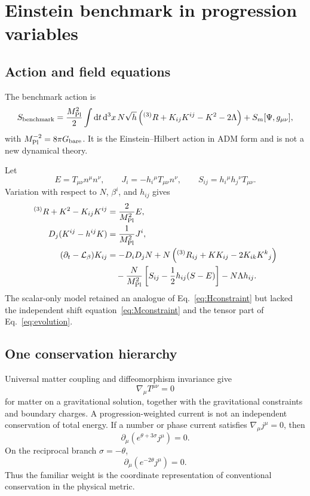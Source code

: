 \documentclass[11pt]{article}
\newcommand{\Mpl}{M_{\rm Pl}}
\newcommand{\Gb}{G_{\rm bare}}
\newcommand{\dd}{\mathrm{d}}
\newcommand{\Lie}{\mathcal L}
\newcommand{\Rthree}{{}^{(3)}R}
\newcommand{\Rthreeij}{{}^{(3)}R_{ij}}
\begin{document}
\section{Einstein benchmark in progression variables}

\subsection{Action and field equations}

The benchmark action is
\begin{equation}
S_{\rm benchmark}=\frac{\Mpl^2}{2}\int \dd t\,\dd^3x\,N\sqrt h
\left(\Rthree+K_{ij}K^{ij}-K^2-2\Lambda\right)
+S_m[\Psi,g_{\mu\nu}],
\label{eq:EHADM}
\end{equation}
with $\Mpl^{-2}=8\pi\Gb$.  It is the Einstein--Hilbert action in ADM form and is not a new dynamical theory.

Let
\begin{equation}
E=T_{\mu\nu}n^\mu n^\nu,\qquad
J_i=-h_i{}^\mu T_{\mu\nu}n^\nu,\qquad
S_{ij}=h_i{}^\mu h_j{}^\nu T_{\mu\nu}.
\end{equation}
Variation with respect to $N$, $\beta^i$, and $h_{ij}$ gives
\begin{align}
\Rthree+K^2-K_{ij}K^{ij}&=\frac{2}{\Mpl^2}E,
\label{eq:Hconstraint}\\
D_j(K^{ij}-h^{ij}K)&=\frac{1}{\Mpl^2}J^i,
\label{eq:Mconstraint}\\
(\partial_t-\Lie_\beta)K_{ij}&=-D_iD_jN+N\left(\Rthreeij+KK_{ij}-2K_{ik}K^k{}_j\right)
\nonumber\\
&\quad-\frac{N}{\Mpl^2}\left[S_{ij}-\frac12h_{ij}(S-E)\right]-N\Lambda h_{ij}.
\label{eq:evolution}
\end{align}
The scalar-only model retained an analogue of Eq.~\eqref{eq:Hconstraint} but lacked the independent shift equation~\eqref{eq:Mconstraint} and the tensor part of Eq.~\eqref{eq:evolution}.

\subsection{One conservation hierarchy}

Universal matter coupling and diffeomorphism invariance give
\begin{equation}
\nabla_\mu T^{\mu\nu}=0
\label{eq:conservation}
\end{equation}
for matter on a gravitational solution, together with the gravitational constraints and boundary charges.  A progression-weighted current is not an independent conservation of total energy.  If a number or phase current satisfies $\nabla_\mu j^\mu=0$, then
\begin{equation}
\partial_\mu\left(e^{\theta+3\sigma}j^\mu\right)=0.
\label{eq:weightedgeneral}
\end{equation}
On the reciprocal branch $\sigma=-\theta$,
\begin{equation}
\partial_\mu\left(e^{-2\theta}j^\mu\right)=0.
\label{eq:weightedrecip}
\end{equation}
Thus the familiar weight is the coordinate representation of conventional conservation in the physical metric.
\end{document}
